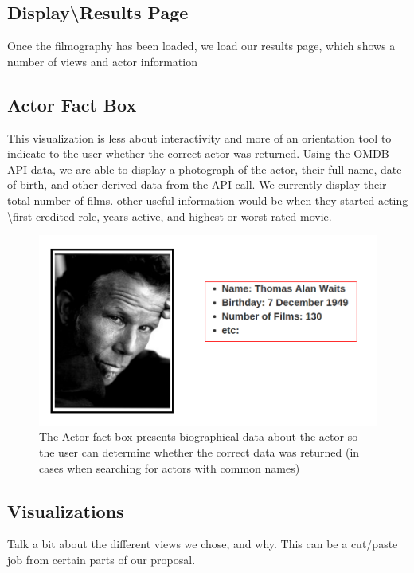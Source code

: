 \documentclass[12pt]{article}
\begin{document}
\subsection{Display\textbackslash Results Page}
Once the filmography has been loaded, we load our results page, which  shows a number of views and actor information

\subsection{Actor Fact Box}

	This visualization is less about interactivity and more of an orientation tool to indicate to the user whether the correct actor was returned.  Using the OMDB API data, we are able to display a photograph of the actor, their full name, date of birth, and other derived data from the API call.  We currently display their total number of films.  other useful information would be when they started acting \textbackslash first credited role, years active, and highest or worst rated movie.

			\begin{figure}[h!]
						\centering
						\includegraphics[scale=0.3]{images/actorBox.png}
						\caption{The Actor fact box presents biographical data about the actor so the user can determine whether the correct data was returned (in cases when searching for actors with common names)}
					\end{figure}


\subsection{Visualizations}

	Talk a bit about the different views we chose, and why.  This can be a cut/paste job from certain parts of our proposal.
\end{document}
